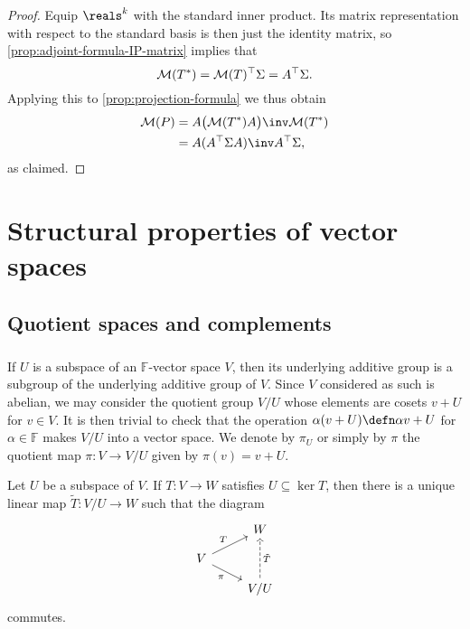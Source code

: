 \documentclass[a4paper, 11pt]{memoir}
\numberwithin{equation}{chapter}
\newcommand{\trans}{^{\top}}
\newcommand{\field}{\mathbb{F}}
\newcommand{\newpar}{\paragraph{}}
\begin{document}
\begin{proof}
    Equip $\reals^k$ with the standard inner product. Its matrix representation with respect to the standard basis is then just the identity matrix, so \cref{prop:adjoint-formula-IP-matrix} implies that
    \begin{equation*}
        \smr{T^*}
            = \smr{T}\trans \Sigma
            = A\trans \Sigma.
    \end{equation*}
    Applying this to \cref{prop:projection-formula} we thus obtain
    \begin{align*}
        \smr{P}
            &= A \bigl( \smr{T^*} A \bigr)\inv \smr{T^*} \\
            &= A (A\trans \Sigma A)\inv A\trans \Sigma,
    \end{align*}
    as claimed.
\end{proof}


\chapter{Structural properties of vector spaces}

\section{Quotient spaces and complements}

\newpar

If $U$ is a subspace of an $\field$-vector space $V$, then its underlying additive group is a subgroup of the underlying additive group of $V$. Since $V$ considered as such is abelian, we may consider the quotient group $V/U$ whose elements are cosets $v + U$ for $v \in V$. It is then trivial to check that the operation $\alpha(v + U) \defn \alpha v + U$ for $\alpha \in \field$ makes $V/U$ into a vector space. We denote by $\pi_U$ or simply by $\pi$ the quotient map $\pi \colon V \to V/U$ given by $\pi(v) = v + U$.

\begin{theorem}
    Let $U$ be a subspace of $V$. If $T \colon V \to W$ satisfies $U \subseteq \ker T$, then there is a unique linear map $\tilde{T} \colon V/U \to W$ such that the diagram
    \begin{equation*}
        \begin{tikzcd}[row sep=small]
            & W \\
            V
                \ar[ur, "T"]
                \ar[dr, "\pi", swap] \\
            & V/U
                \ar[uu, "\tilde{T}", swap, dashed]
        \end{tikzcd}
    \end{equation*}
    commutes.
\end{theorem}
\end{document}
